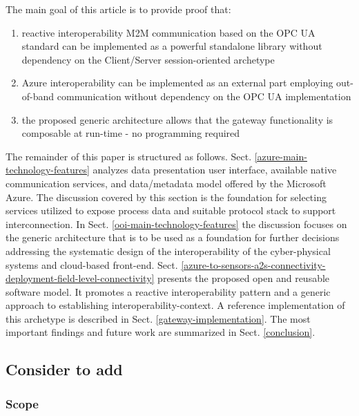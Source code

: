 \documentclass{jacsart}
\providecommand{\tightlist} { \setlength{\itemsep}{0pt}\setlength{\parskip}{0pt}}
\begin{document}
The main goal of this article is to provide proof that:

\begin{enumerate}
\def\labelenumi{\arabic{enumi}.}
\tightlist
\item
  reactive interoperability M2M communication based on the OPC UA
  standard can be implemented as a powerful standalone library without
  dependency on the Client/Server session-oriented archetype
\item
  Azure interoperability can be implemented as an external part
  employing out-of-band communication without dependency on the OPC UA
  implementation
\item
  the proposed generic architecture allows that the gateway
  functionality is composable at run-time - no programming required
\end{enumerate}

The remainder of this paper is structured as follows. Sect. \ref*{azure-main-technology-features} analyzes data presentation user interface, available native communication services, and
data/metadata model offered by the Microsoft Azure. The discussion
covered by this section is the foundation for selecting services
utilized to expose process data and suitable protocol stack to support
interconnection. In Sect. \ref*{ooi-main-technology-features} the discussion focuses on the generic architecture that is to be used as a
foundation for further decisions addressing the systematic design of the
interoperability of the cyber-physical systems and cloud-based
front-end. Sect. \ref*{azure-to-sensors-a2s-connectivity-deployment-field-level-connectivity} presents the proposed open and reusable software model. It promotes a
reactive interoperability pattern and a generic approach to establishing
interoperability-context. A reference implementation of this archetype
is described in Sect.  \ref*{gateway-implementation}. The most
important findings and future work are summarized in Sect. \ref*{conclusion}.

\hypertarget{consider-to-add}{%
\subsection{Consider to add}\label{consider-to-add}}

\hypertarget{scope}{%
\subsubsection{Scope}\label{scope}}
\end{document}
